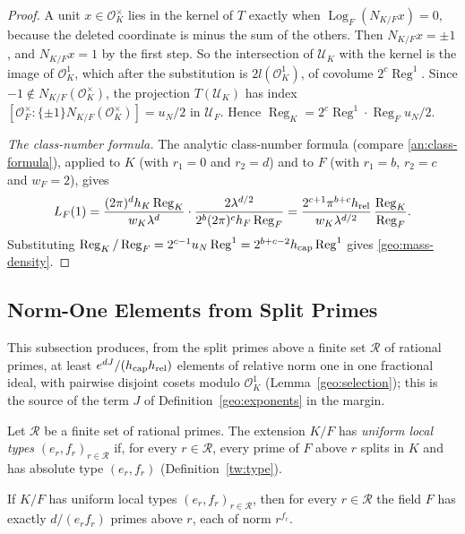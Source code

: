 \begin{proof}
A unit $x\in\mathcal O_K^\times$ lies in the kernel of $T$ exactly
when $\operatorname{Log}_F(N_{K/F}x)=0$, because the deleted coordinate
is minus the sum of the others. Then $N_{K/F}x=\pm1$, and $N_{K/F}x=1$
by the first step. So the intersection of $\mathcal U_K$ with the kernel is
the image of $\mathcal O_K^1$, which after the substitution is
$2l(\mathcal O_K^1)$, of covolume $2^c\operatorname{Reg}^1$. Since
$-1\notin N_{K/F}(\mathcal O_K^\times)$, the projection
$T(\mathcal U_K)$ has index
$[\mathcal O_F^\times:\{\pm1\}N_{K/F}(\mathcal O_K^\times)]=u_N/2$ in
$\mathcal U_F$. Hence
$\operatorname{Reg}_K=2^c\operatorname{Reg}^1\cdot\operatorname{Reg}_Fu_N/2$.

\emph{The class-number formula.} The analytic class-number formula
\cite[Chapter~V, Theorem~2.4]{MilneCFT} (compare
\eqref{an:class-formula}), applied to $K$ (with $r_1=0$
and $r_2=d$) and to $F$ (with $r_1=b$, $r_2=c$ and $w_F=2$), gives
\[
 L_F(1)=\frac{(2\pi)^dh_K\operatorname{Reg}_K}{w_K\lambda^d}\cdot
 \frac{2\lambda^{d/2}}{2^b(2\pi)^ch_F\operatorname{Reg}_F}
 =\frac{2^{c+1}\pi^{b+c}h_{\rm rel}}{w_K\lambda^{d/2}}\,
 \frac{\operatorname{Reg}_K}{\operatorname{Reg}_F}.
\]
Substituting
$\operatorname{Reg}_K/\operatorname{Reg}_F=2^{c-1}u_N\operatorname{Reg}^1
=2^{b+c-2}h_{\rm cap}\operatorname{Reg}^1$ gives \eqref{geo:mass-density}.
\end{proof}

\subsection{Norm-One Elements from Split Primes}

This subsection produces, from the split primes above a finite set
$\mathcal R$ of rational primes, at least $e^{dJ}/(h_{\rm cap}h_{\rm rel})$
elements of relative norm one in one fractional ideal, with pairwise disjoint
cosets modulo $\mathcal O_K^1$ (Lemma~\ref{geo:selection}); this is the source
of the term $J$ of Definition~\ref{geo:exponents} in the margin.

\begin{definition}\label{geo:uniform-types}
Let $\mathcal R$ be a finite set of rational primes. The extension $K/F$
has \emph{uniform local types} $(e_r,f_r)_{r\in\mathcal R}$ if, for every
$r\in\mathcal R$, every prime of $F$ above $r$ splits in $K$ and has
absolute type $(e_r,f_r)$ (Definition~\ref{tw:type}).
\end{definition}

\begin{lemma}\label{geo:prime-count}
If $K/F$ has uniform local types $(e_r,f_r)_{r\in\mathcal R}$, then for
every $r\in\mathcal R$ the field $F$ has exactly $d/(e_rf_r)$ primes above
$r$, each of norm $r^{f_r}$.
\end{lemma}

